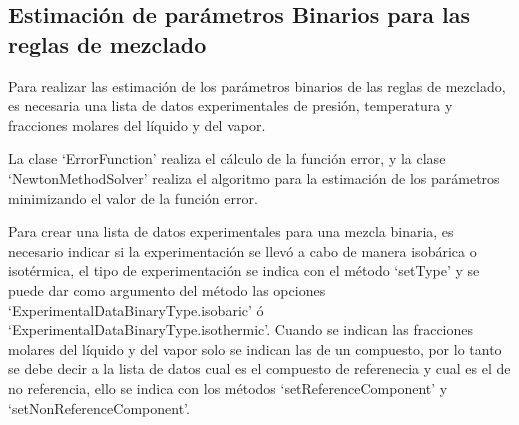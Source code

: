
\newcommand{\binaryDiagram}[1] {
\begin{tikzpicture}
\begin{axis}[xlabel={Fración molar del metanol},ylabel=\temperature,legend entries={Experimentales líquido,Experimentales vapor,Calculados líquido,Calculados Vapor},legend style={at={(1.03,0.5)},anchor=west,font=\footnotesize}]
\addplot[amber,only marks,mark size = 1pt]table[x=x1, y=expTemp]{#1};
\addplot[blue,only marks,mark size = 1pt]table[x=yExp, y=expTemp]{#1};
\addplot[green,thick] table[x=x1, y=calcTemp]{#1};
\addplot[red,thick] table[x=yCalc, y=calcTemp]{#1};
\end{axis}
\end{tikzpicture}
 }
\newcommand{\alphaDiagram}[1]{
\begin{tikzpicture}
\begin{axis}
\addplot[blue,only marks,mark size = 1pt]table[x=temperature, y=expPressure]{#1};
\addplot[red,thick]table[x=temperature, y=calcPressure]{#1};
\end{axis}
\end{tikzpicture}
}



\subsection{Estimación de parámetros Binarios para las reglas de mezclado}\label{subsec:binaryoptim}

	Para realizar las estimación de los parámetros binarios de las reglas de mezclado, es necesaria una lista de datos experimentales de presión, temperatura y fracciones molares del líquido y del vapor.

	La clase `ErrorFunction' realiza el cálculo de la función error, y la clase `NewtonMethodSolver' realiza el algoritmo para la estimación de los parámetros minimizando el valor de la función error.

	Para crear una lista de datos experimentales para una mezcla binaria, es necesario indicar si la experimentación se llevó a cabo de manera isobárica o isotérmica, el tipo de experimentación se indica con el método `setType' y se puede dar como argumento del método las opciones `ExperimentalDataBinaryType.isobaric' ó  `ExperimentalDataBinaryType.isothermic'. Cuando se indican las fracciones molares del líquido y del vapor solo se indican las de un compuesto, por lo tanto se debe decir a la lista de datos cual es el compuesto de referenecia y cual es el de no referencia, ello se indica con los métodos `setReferenceComponent' y `setNonReferenceComponent'.

